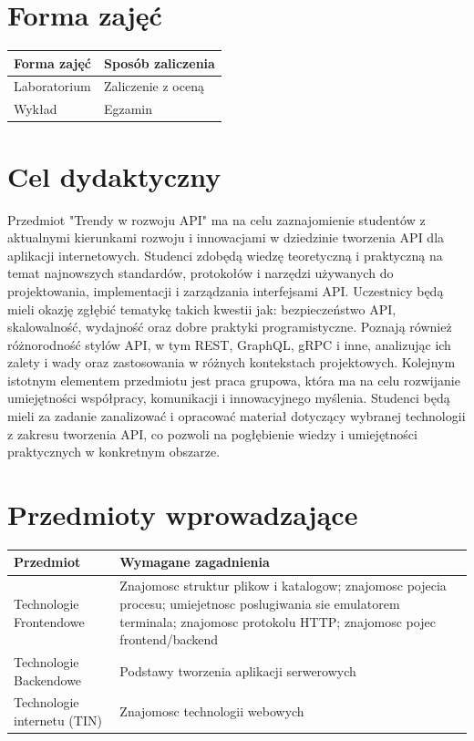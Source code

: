 \documentclass[12pt, a4paper]{article}
\begin{document}
\section{Forma zajęć}

\begin{tabular}{ll}
  \hline
  \textbf{Forma zajęć} & \textbf{Sposób zaliczenia} \\
  \hline
  Laboratorium & Zaliczenie z oceną \\
  Wykład & Egzamin \\
  \hline
\end{tabular}

\section{Cel dydaktyczny}

Przedmiot "Trendy w rozwoju API" ma na celu zaznajomienie studentów z aktualnymi kierunkami rozwoju i innowacjami w dziedzinie tworzenia API dla aplikacji internetowych. Studenci zdobędą wiedzę teoretyczną i praktyczną na temat najnowszych standardów, protokołów i narzędzi używanych do projektowania, implementacji i zarządzania interfejsami API. Uczestnicy będą mieli okazję zgłębić tematykę takich kwestii jak: bezpieczeństwo API, skalowalność, wydajność oraz dobre praktyki programistyczne. Poznają również różnorodność stylów API, w tym REST, GraphQL, gRPC i inne, analizując ich zalety i wady oraz zastosowania w różnych kontekstach projektowych. Kolejnym istotnym elementem przedmiotu jest praca grupowa, która ma na celu rozwijanie umiejętności współpracy, komunikacji i innowacyjnego myślenia. Studenci będą mieli za zadanie zanalizować i opracować materiał dotyczący wybranej technologii z zakresu tworzenia API, co pozwoli na pogłębienie wiedzy i umiejętności praktycznych w konkretnym obszarze.

\section{Przedmioty wprowadzające}

\begin{tabularx}{\textwidth}{lX}
  \hline
  \textbf{Przedmiot} & \textbf{Wymagane zagadnienia} \\
  \hline
  Technologie Frontendowe & Znajomosc struktur plikow i katalogow; znajomosc pojecia procesu; umiejetnosc poslugiwania sie emulatorem terminala; znajomosc protokolu HTTP; znajomosc pojec frontend/backend \\
  Technologie Backendowe & Podstawy tworzenia aplikacji serwerowych \\
  Technologie internetu (TIN) & Znajomosc technologii webowych \\
  \hline
\end{tabularx}
\end{document}

